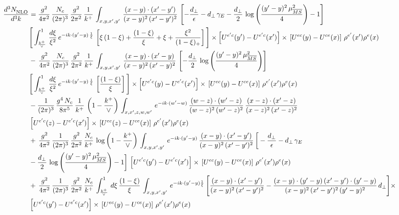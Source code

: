 \begin{align}
    \frac{d^{3}N_{\rm NLO}^{\rm}}{d^{3}k}  & =  \frac{g^{2}}{4\pi^{2}}\, \frac{N_{c}}{(2\pi)^{3}}\,\frac{g^{2}}{2\pi^{2}}\, \frac{1}{k^{+}}\,\int_{x,y,x',y'}\,\frac{(x-y)\cdot (x'-y')}{(x-y)^{2}\,(x'-y')^{2}}\,\left[-\frac{d_{\perp}}{\epsilon}-d_{\perp}\,\gamma_{E}-\frac{d_{\perp}}{2}\,\log{\left(\frac{(y'-y)^{2}\,\mu^{2}_{\overline{MS}}}{4}\right)}-1\right]\,\notag \\ & \Bigg[\int_{\frac{k^{+}}{\vee}}^{1}\,\frac{d\xi}{\xi^{2}}\,e^{-ik\cdot (y'-y)\,\frac{1}{\xi}}\,\left[\xi\,(1-\xi)+\frac{(1-\xi)}{\xi}+\xi+\frac{\xi^{2}}{(1-\xi)_{+}}\right]\Bigg]\times \left[U^{e'c}(y') - U^{e'c}(x')\right] \times\, \left[U^{ec}(y) - U^{ce}(x)\right]\, \rho^{e'}(x') \rho^{e}(x) \notag \\
&   -\,\frac{g^{2}}{4\pi^{2}}\, \frac{N_{c}}{(2\pi)^{3}}\,\frac{g^{2}}{2\pi^{2}}\, \frac{1}{k^{+}}\,\int_{x,y,x',y'}\,\frac{(x-y)\cdot (x'-y)}{(x-y)^{2}\,(x'-y)^{2}}\,\left[-\frac{d_{\perp}}{2}\,\log{\left(\frac{(y'-y)^{2}\,\mu^{2}_{\overline{MS}}}{4}\right)}\right]\,\notag \\ &  \Bigg[\int_{\frac{k^{+}}{\vee}}^{1}\,\frac{d\xi}{\xi^{2}}\,e^{-ik\cdot (y'-y)\,\frac{1}{\xi}}\,\left[\frac{(1-\xi)}{\xi}\right]\Bigg]\times \left[U^{e'c}(y) - U^{e'c}(x')\right] \times\, \left[U^{ec}(y) - U^{ce}(x)\right]\, \rho^{e'}(x') \rho^{e}(x) \notag \\
&   -\frac{1}{(2\pi)^{3}}\,\frac{g^{4}\,N_{c}}{8\pi^{5}}\,\frac{1}{k^{+}}\,\left(1-\frac{k^{+}}{\vee}\right)\,\int_{x,x',z,w,w'}\,e^{-ik\cdot (w'-w)}\,\frac{(w-z)\cdot(w'-z)}{(w-z)^{2}\,(w'-z)^{2}}\,\frac{(x-z)\cdot(x'-z)}{(x-z)^{2}\,(x'-z)^{2}}\notag \\
& \left[U^{e'c}(z) - U^{e'c}(x')\right] \times\, \left[U^{ec}(z) - U^{ce}(x)\right]\, \rho^{e'}(x') \rho^{e}(x) \notag \\
&  +\, \frac{g^{2}}{4\pi^{2}}\, \frac{1}{(2\pi)^{3}}\,\frac{g^{2}}{2\pi^{2}}\, \frac{N_{c}}{k^{+}}\,\log{\left(1-\frac{k^{+}}{\vee}\right)}\,\int_{x,y,x',y'}\,e^{-ik\cdot (y'-y)}\,\frac{(x-y)\cdot (x'-y')}{(x-y)^{2}\,(x'-y')^{2}}\,\bigg[-\frac{d_{\perp}}{\epsilon}-d_{\perp}\,\gamma_{E}\notag \\ & -\frac{d_{\perp}}{2}\,\log{\left(\frac{(y'-y)^{2}\,\mu^{2}_{\overline{MS}}}{4}\right)}-1\bigg]\,\left[U^{e'c}(y') - U^{e'c}(x')\right] \times\, \left[U^{ec}(y) - U^{ce}(x)\right]\, \rho^{e'}(x') \rho^{e}(x) \notag \\
& +\,\frac{g^{2}}{4\pi^{2}}\, \frac{1}{(2\pi)^{3}}\,\frac{g^{2}}{2\pi^{2}}\, \frac{N_{c}}{k^{+}}\,\int_{\frac{k^{+}}{\vee}}^{1}\,d\xi\, \frac{(1-\xi)}{\xi}\, \int_{x,y,x',y'}\,e^{-ik\cdot (y'-y)\frac{1}{\xi}}\,\Bigg[\frac{(x-y)\cdot (x'-y')}{(x-y)^{2}\, (x'-y')^{2}} -\frac{(x-y)\cdot (y'-y)\, (x'-y')\cdot (y'-y)}{(x-y)^{2}\,(x'-y')^{2}\,(y'-y)^{2}}\,d_{\perp}\Bigg]\times\notag \\ &  \left[U^{e'c}(y') - U^{e'c}(x')\right] \times\, \left[U^{ec}(y) - U^{ce}(x)\right]\, \rho^{e'}(x') \rho^{e}(x)
\end{align}
